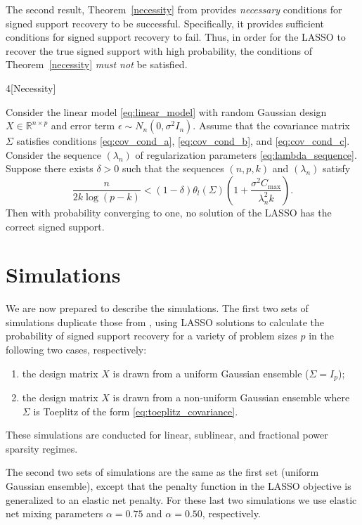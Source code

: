 \documentclass[letterpaper,12pt]{article}
\begin{document}
The second result, Theorem~\ref{necessity} from \cite{wainwright06}
provides \emph{necessary} conditions for signed support recovery to be
successful. Specifically, it provides sufficient conditions for signed
support recovery to fail. Thus, in order for the LASSO to recover the
true signed support with high probability, the conditions of
Theorem~\ref{necessity} \emph{must not} be satisfied.
\begin{customthm}{4}[Necessity] \label{necessity}

  Consider the linear model \eqref{eq:linear_model} with random
  Gaussian design $X \in \mathbb{R}^{n \times p}$ and error term
  $\epsilon \sim N_n(0, \sigma^2 I_n)$. Assume that the covariance
  matrix $\Sigma$ satisfies conditions \eqref{eq:cov_cond_a},
  \eqref{eq:cov_cond_b}, and \eqref{eq:cov_cond_c}. Consider the
  sequence $(\lambda_n)$ of regularization parameters
  \eqref{eq:lambda_sequence}. Suppose there exists $\delta > 0$ such
  that the sequences $(n, p, k)$ and $(\lambda_n)$ satisfy
  \begin{equation*}
    \frac{n}{2k \log (p - k)}
      < (1 - \delta) \theta_l(\Sigma)
        \left ( 1 + \frac{\sigma^2 C_{\mathrm{max}}}{\lambda_n^2 k}
        \right ).
  \end{equation*}
  Then with probability converging to one, no solution of the LASSO
  has the correct signed support.
\end{customthm}

\section*{Simulations}

We are now prepared to describe the simulations. The first two sets of
simulations duplicate those from \cite{wainwright06}, using LASSO
solutions to calculate the probability of signed support recovery for
a variety of problem sizes $p$ in the following two cases,
respectively:
\begin{enumerate}
\item the design matrix $X$ is drawn from a uniform Gaussian ensemble
  ($\Sigma = I_p$);
\item the design matrix $X$ is drawn from a non-uniform Gaussian
  ensemble where $\Sigma$ is Toeplitz of the form
  \eqref{eq:toeplitz_covariance}.
\end{enumerate}
These simulations are conducted for linear, sublinear, and fractional
power sparsity regimes.

The second two sets of simulations are the same as the first set
(uniform Gaussian ensemble), except that the penalty function in the
LASSO objective is generalized to an elastic net penalty. For these
last two simulations we use elastic net mixing parameters
$\alpha = 0.75$ and $\alpha = 0.50$, respectively.
\end{document}

